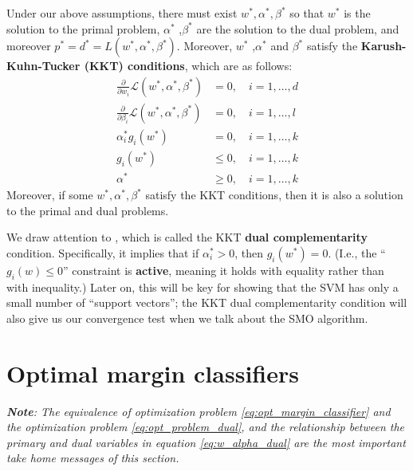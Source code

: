 Under our above assumptions, there must exist $w^* ,\alpha^* ,\beta^*$ so that $w^*$ is the
solution to the primal problem, $\alpha^*$ ,$\beta^*$ are the solution to the dual problem,
and moreover $p^* = d^* = L(w^* ,\alpha^* ,\beta^*)$. Moreover, $w^*$ ,$\alpha^*$ and $\beta^*$ satisfy the
\textbf{Karush-Kuhn-Tucker (KKT) conditions}, which are as follows:
\begin{align}
    \frac{\partial}{\partial w_i} \mathcal L(w^* ,\alpha^* ,\beta^* ) &= 0, \quad i = 1,\ldots ,d\label{eq:kkt1}\\
    \frac{\partial}{\partial \beta_i} \mathcal L(w^* ,\alpha^* ,\beta^* ) &= 0, \quad i = 1,\ldots ,l\label{eq:kkt2}\\
    \alpha^*_i g_i (w^*) &= 0, \quad i = 1,\ldots ,k\label{eq:kkt3}\\
    g_i (w^*) &\le 0, \quad i = 1,\ldots ,k\label{eq:kkt4}\\
    \alpha^* &\ge 0, \quad i = 1,\ldots ,k\label{eq:kkt5}
\end{align}
Moreover, if some $w^* ,\alpha^* ,\beta^*$ satisfy the KKT conditions, then it is also a
solution to the primal and dual problems.

We draw attention to , which is called the KKT \textbf{dual
complementarity} condition. Specifically, it implies that if $\alpha^*_i > 0$, then
$g_i (w^*) = 0$. (I.e., the ``$g_i (w) \le 0$'' constraint is \textbf{active}, meaning it holds with
equality rather than with inequality.) Later on, this will be key for showing
that the SVM has only a small number of ``support vectors''; the KKT dual
complementarity condition will also give us our convergence test when we
talk about the SMO algorithm.

\section{Optimal margin classifiers}
\textit{\textbf{Note}: The equivalence of optimization problem \ref{eq:opt_margin_classifier} and the optimization
problem \ref{eq:opt_problem_dual}, and the relationship between the primary and dual variables in
equation \ref{eq:w_alpha_dual} are the most important take home messages of this section.}

